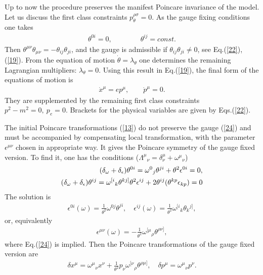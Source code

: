 \documentclass[paper a4]{article}
\begin{document}
Up to now the procedure preserves the manifest Poincare invariance of
the model. Let us discuss the first class constraints
$p_\theta^{\rho\sigma}=0$. As the gauge fixing conditions one takes
\begin{eqnarray}\label{24}
\theta^{0i}=0, \qquad \qquad \theta^{ij}=const.
\end{eqnarray}
Then $\theta^{\mu\nu}\theta_{\mu\nu}=
-\theta_{ij}\theta_{ji}$, and the gauge is admissible if
$\theta_{ij}\theta_{ji}\ne 0$, see Eq.(\ref{22}), (\ref{19}). From the
equation of motion
$\dot\theta=\lambda_\theta$ one determines the remaining Lagrangian
multipliers: $\lambda_\theta=0$. Using this result in Eq.(\ref{19}),
the final form of the equations of motion is
\begin{eqnarray}\label{25}
\dot x^\mu=ep^\mu, \qquad \dot p^\mu=0.
\end{eqnarray}
They are supplemented by the
remaining first class constraints $p^2-m^2=0, ~ p_e=0$. Brackets for
the physical variables are given by Eqs.(\ref{22}).

The initial Poincare transformations (\ref{13}) do not preserve the gauge
(\ref{24}) and must be accompanied by compensating local transformation,
with the parameter $\epsilon^{\mu\nu}$ chosen in appropriate way.
It gives the Poincare symmetry of the gauge fixed version. To find it,
one has the conditions ($\Lambda^\mu{}_\nu=\delta^\mu_\nu+
\omega^\mu{}_\nu$)
\begin{eqnarray}\label{26}
(\delta_\omega+\delta_\epsilon)\theta^{0i}=\omega^0{}_j\theta^{ji}+
\theta^2\epsilon^{0i}=0, \cr
(\delta_\omega+\delta_\epsilon)\theta^{ij}=\omega^{[i}{}_k\theta^{kj]}
\theta^2\epsilon^{ij}+2\theta^{ij}(\theta^{kp}\epsilon_{kp})=0
\end{eqnarray}
The solution is
\begin{eqnarray}\label{27}
\epsilon^{0i}(\omega)=\frac{1}{\theta^2}\omega^{0j}\theta^{ji}, \quad
\epsilon^{ij}(\omega)=\frac{1}{\theta^2}\omega^{[i}{}_k\theta_k{}^{j]},
\end{eqnarray}
or, equivalently
\begin{eqnarray}\label{28}
\epsilon^{\mu\nu}(\omega)=-\frac{1}{\theta^2}
\omega^{[\mu}{}_\rho\theta^{\rho\nu]},
\end{eqnarray}
where Eq.(\ref{24}) is implied. Then the Poincare transformations of
the gauge fixed version are
\begin{eqnarray}\label{29}
\delta x^\mu=\omega^\mu{}_\nu x^\nu+\frac{1}{\theta^2}p_\nu
\omega^{[\nu}{}_\rho\theta^{\rho\mu]}, \quad
\delta p^\mu=\omega^\mu{}_\nu p^\nu.
\end{eqnarray}
\end{document}
